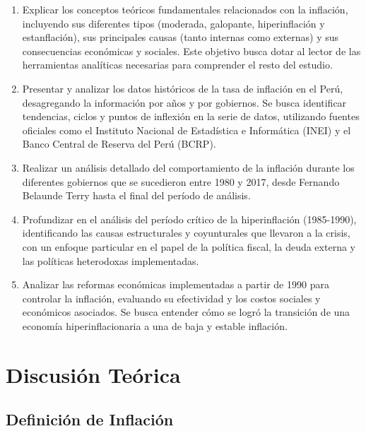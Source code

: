 \documentclass[
  stu,
  floatsintext,
  longtable,
  a4paper,
  nolmodern,
  notxfonts,
  notimes,
  12pt,
  colorlinks=true,linkcolor=blue,citecolor=blue,urlcolor=blue]{apa7}
\begin{document}
\begin{enumerate}
\def\labelenumi{\arabic{enumi}.}
\item
  Explicar los conceptos teóricos fundamentales relacionados con la
  inflación, incluyendo sus diferentes tipos (moderada, galopante,
  hiperinflación y estanflación), sus principales causas (tanto internas
  como externas) y sus consecuencias económicas y sociales. Este
  objetivo busca dotar al lector de las herramientas analíticas
  necesarias para comprender el resto del estudio.
\item
  Presentar y analizar los datos históricos de la tasa de inflación en
  el Perú, desagregando la información por años y por gobiernos. Se
  busca identificar tendencias, ciclos y puntos de inflexión en la serie
  de datos, utilizando fuentes oficiales como el Instituto Nacional de
  Estadística e Informática (INEI) y el Banco Central de Reserva del
  Perú (BCRP).
\item
  Realizar un análisis detallado del comportamiento de la inflación
  durante los diferentes gobiernos que se sucedieron entre 1980 y 2017,
  desde Fernando Belaunde Terry hasta el final del período de análisis.
\item
  Profundizar en el análisis del período crítico de la hiperinflación
  (1985-1990), identificando las causas estructurales y coyunturales que
  llevaron a la crisis, con un enfoque particular en el papel de la
  política fiscal, la deuda externa y las políticas heterodoxas
  implementadas.
\item
  Analizar las reformas económicas implementadas a partir de 1990 para
  controlar la inflación, evaluando su efectividad y los costos sociales
  y económicos asociados. Se busca entender cómo se logró la transición
  de una economía hiperinflacionaria a una de baja y estable inflación.
\end{enumerate}

\section{Discusión Teórica}\label{discusiuxf3n-teuxf3rica}

\subsection{Definición de
Inflación}\label{definiciuxf3n-de-inflaciuxf3n}
\end{document}
